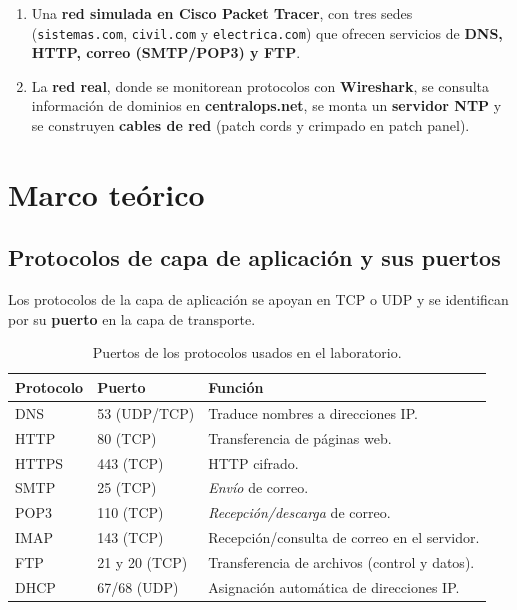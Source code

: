\documentclass[11pt,a4paper]{report}
\begin{document}
\begin{enumerate}
  \item Una \textbf{red simulada en Cisco Packet Tracer}, con tres sedes
        (\texttt{sistemas.com}, \texttt{civil.com} y \texttt{electrica.com}) que ofrecen
        servicios de \textbf{DNS, HTTP, correo (SMTP/POP3) y FTP}.
  \item La \textbf{red real}, donde se monitorean protocolos con \textbf{Wireshark}, se
        consulta información de dominios en \textbf{centralops.net}, se monta un
        \textbf{servidor NTP} y se construyen \textbf{cables de red} (patch cords y
        crimpado en patch panel).
\end{enumerate}

\section{Marco teórico}

\subsection{Protocolos de capa de aplicación y sus puertos}

Los protocolos de la capa de aplicación se apoyan en TCP o UDP y se identifican por su
\textbf{puerto} en la capa de transporte.

\begin{table}[H]
  \centering
  \begin{tabularx}{\linewidth}{@{}llX@{}}
    \toprule
    \textbf{Protocolo} & \textbf{Puerto} & \textbf{Función} \\
    \midrule
    DNS  & 53 (UDP/TCP)  & Traduce nombres a direcciones IP. \\
    HTTP & 80 (TCP)      & Transferencia de páginas web. \\
    HTTPS & 443 (TCP)    & HTTP cifrado. \\
    SMTP & 25 (TCP)      & \emph{Envío} de correo. \\
    POP3 & 110 (TCP)     & \emph{Recepción/descarga} de correo. \\
    IMAP & 143 (TCP)     & Recepción/consulta de correo en el servidor. \\
    FTP  & 21 y 20 (TCP) & Transferencia de archivos (control y datos). \\
    DHCP & 67/68 (UDP)   & Asignación automática de direcciones IP. \\
    \bottomrule
  \end{tabularx}
  \caption{Puertos de los protocolos usados en el laboratorio.}
\end{table}
\end{document}
